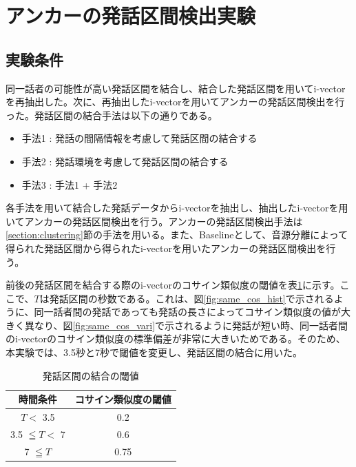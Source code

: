 \section{アンカーの発話区間検出実験}
\label{chapter:get_anchor}

\subsection{実験条件}
同一話者の可能性が高い発話区間を結合し、結合した発話区間を用いてi-vectorを再抽出した。次に、再抽出したi-vectorを用いてアンカーの発話区間検出を行った。発話区間の結合手法は以下の通りである。

\begin{itemize}
\item 手法1 : 発話の間隔情報を考慮して発話区間の結合する
\item 手法2 : 発話環境を考慮して発話区間の結合する
\item 手法3 : 手法1 + 手法2
\end{itemize}

各手法を用いて結合した発話データからi-vectorを抽出し、抽出したi-vectorを用いてアンカーの発話区間検出を行う。アンカーの発話区間検出手法は\ref{section:clustering}節の手法を用いる。また、Baselineとして、音源分離によって得られた発話区間から得られたi-vectorを用いたアンカーの発話区間検出を行う。


前後の発話区間を結合する際のi-vectorのコサイン類似度の閾値を表\ref{table:decide_thcos}に示す。ここで、$T$は発話区間の秒数である。これは、図\ref{fig:same_cos_hist}で示されるように、同一話者間の発話であっても発話の長さによってコサイン類似度の値が大きく異なり、図\ref{fig:same_cos_vari}で示されるように発話が短い時、同一話者間のi-vectorのコサイン類似度の標準偏差が非常に大きいためである。そのため、本実験では、3.5秒と7秒で閾値を変更し、発話区間の結合に用いた。

\begin{table}[H]
  \begin{center}
    \caption{発話区間の結合の閾値 \label{table:decide_thcos}}
    \begin{tabular}{|c||c|} \hline
時間条件 & コサイン類似度の閾値  \\ \hline
$T <$ 3.5 &  0.2 \\ \hline
3.5 $\leqq T <$ 7 &  0.6  \\ \hline
7 $\leqq T$ &  0.75 \\ \hline
    \end{tabular}
  \end{center}
\end{table}

